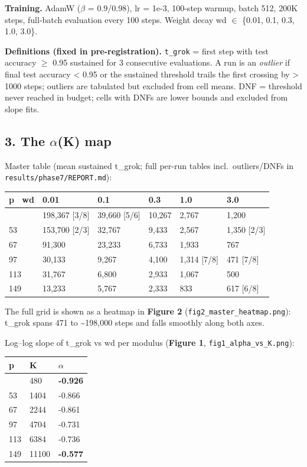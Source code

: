 \documentclass[
  11pt,
]{article}
\newcounter{none} %
\begin{document}
\textbf{Training.} AdamW ($\beta$ = 0.9/0.98), lr = 1e-3, 100-step warmup,
batch 512, 200K steps, full-batch evaluation every 100 steps. Weight
decay wd $\in$ \{0.01, 0.1, 0.3, 1.0, 3.0\}.

\textbf{Definitions (fixed in pre-registration).} \texttt{t\_grok} =
first step with test accuracy $\geq$ 0.95 sustained for 3 consecutive
evaluations. A run is an \emph{outlier} if final test accuracy
\textless{} 0.95 or the sustained threshold trails the first crossing by
\textgreater{} 1000 steps; outliers are tabulated but excluded from cell
means. DNF = threshold never reached in budget; cells with DNFs are
lower bounds and excluded from slope fits.

\subsection{3. The $\alpha$(K) map}\label{the-ux3b1k-map}

Master table (mean sustained t\_grok; full per-run tables
incl.~outliers/DNFs in \texttt{results/phase7/REPORT.md}):

{\def\LTcaptype{none} %
\begin{longtable}[]{@{}llllll@{}}
\toprule\noalign{}
p ~wd & 0.01 & 0.1 & 0.3 & 1.0 & 3.0 \\
\midrule\noalign{}
\endhead
\bottomrule\noalign{}
\endlastfoot
31 & 198,367 {[}3/8{]} & 39,660 {[}5/6{]} & 10,267 & 2,767 & 1,200 \\
53 & 153,700 {[}2/3{]} & 32,767 & 9,433 & 2,567 & 1,350 {[}2/3{]} \\
67 & 91,300 & 23,233 & 6,733 & 1,933 & 767 \\
97 & 30,133 & 9,267 & 4,100 & 1,314 {[}7/8{]} & 471 {[}7/8{]} \\
113 & 31,767 & 6,800 & 2,933 & 1,067 & 500 \\
149 & 13,233 & 5,767 & 2,333 & 833 & 617 {[}6/8{]} \\
\end{longtable}
}

The full grid is shown as a heatmap in \textbf{Figure 2}
(\texttt{fig2\_master\_heatmap.png}): t\_grok spans 471 to
\textasciitilde198,000 steps and falls smoothly along both axes.

Log--log slope of t\_grok vs wd per modulus (\textbf{Figure 1},
\texttt{fig1\_alpha\_vs\_K.png}):

{\def\LTcaptype{none} %
\begin{longtable}[]{@{}lll@{}}
\toprule\noalign{}
p & K & $\alpha$ \\
\midrule\noalign{}
\endhead
\bottomrule\noalign{}
\endlastfoot
31 & 480 & \textbf{-0.926} \\
53 & 1404 & -0.866 \\
67 & 2244 & -0.861 \\
97 & 4704 & -0.731 \\
113 & 6384 & -0.736 \\
149 & 11100 & \textbf{-0.577} \\
\end{longtable}
}
\end{document}
